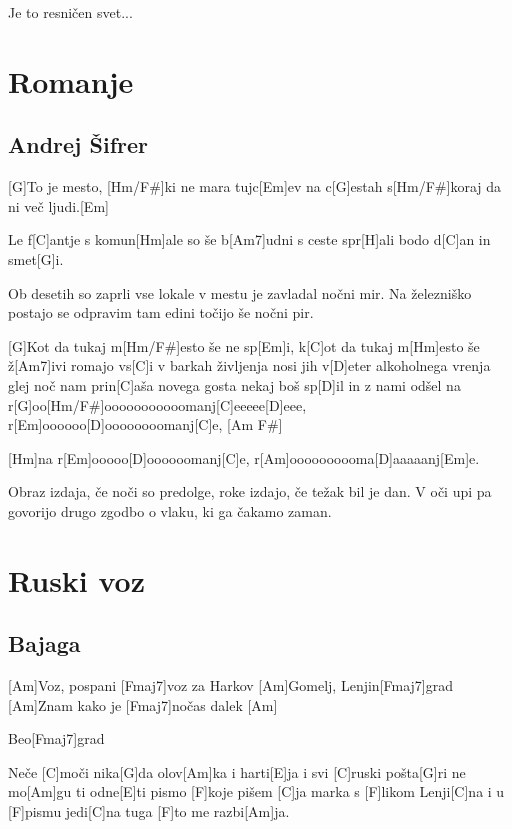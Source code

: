 \documentclass[a4paper,12pt]{article}
\begin{document}
\begin{multicols}{2}
\begin{guitar}
Je to resničen svet...

\end{guitar}
\section{Romanje}
\subsection*{Andrej Šifrer}
\begin{guitar}

[G]To je mesto, [Hm/F#]ki ne mara tujc[Em]ev
na c[G]estah s[Hm/F#]koraj da ni več ljudi.[Em]

Le f[C]antje s komun[Hm]ale so še b[Am7]udni
s ceste spr[H]ali bodo d[C]an in smet[G]i.
 

Ob desetih so zaprli vse lokale
v mestu je zavladal nočni mir.
Na železniško postajo se odpravim
tam edini točijo še nočni pir.


[G]Kot da tukaj m[Hm/F#]esto še ne sp[Em]i,
k[C]ot da tukaj m[Hm]esto še ž[Am7]ivi
romajo vs[C]i v barkah življenja
nosi jih v[D]eter alkoholnega vrenja
glej noč nam prin[C]aša novega gosta
nekaj boš sp[D]il in z nami odšel
na r[G]oo[Hm/F#]ooooooooooomanj[C]eeeee[D]eee,
r[Em]oooooo[D]oooooooomanj[C]e, [Am F#]

[Hm]na r[Em]ooooo[D]oooooomanj[C]e,
r[Am]oooooooooma[D]aaaaanj[Em]e.


Obraz izdaja, če noči so predolge,
roke izdajo, če težak bil je dan.
V oči upi pa govorijo drugo zgodbo
o vlaku, ki ga čakamo zaman.



\end{guitar}
\section{Ruski voz}
\subsection*{Bajaga}
\begin{guitar}
[Am  Fmaj7]

           
[Am]Voz, pospani [Fmaj7]voz za Harkov
[Am]Gomelj, Lenjin[Fmaj7]grad
[Am]Znam kako je [Fmaj7]nočas dalek [Am]

Beo[Fmaj7]grad



Neče [C]moči nika[G]da olov[Am]ka i harti[E]ja
i svi [C]ruski pošta[G]ri ne mo[Am]gu ti odne[E]ti
pismo [F]koje pišem [C]ja marka s [F]likom Lenji[C]na
i u [F]pismu jedi[C]na tuga [F]to me razbi[Am]ja.



\end{guitar}
\end{multicols}
\end{document}

